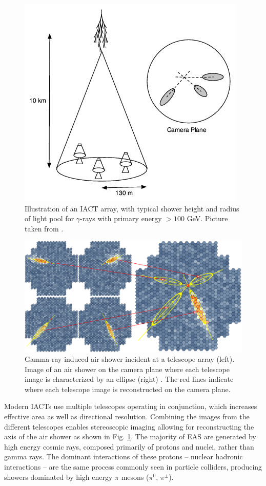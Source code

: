 \documentclass[main.tex]{subfiles}
\begin{document}
\begin{figure}[htbp]
  \centering
  \includegraphics[width=0.68\linewidth]{images/IACT}
  \caption[Illustration of an IACT array.]{Illustration of an IACT array, with typical shower height and radius of light pool for $\gamma$-rays with primary energy $>100$ GeV. Picture taken from \cite{veritas_web}.}
  \label{fig:IACT}
\end{figure}
\begin{figure}[htbp]
  \centering
  \includegraphics[width=0.96\linewidth]{images/Stereo}
  \caption[Gamma-ray EAS at a telescope array.]{Gamma-ray induced air shower incident at a telescope array (left). Image of an air shower on the camera plane where each telescope image is characterized by an ellipse (right) \cite{hess_web}. The red lines indicate where each telescope image is reconstructed on the camera plane.}
  \label{fig:camera_face}
\end{figure}

Modern IACTs use multiple telescopes operating in conjunction, which increases effective area as well as directional resolution. Combining the images from the different telescopes enables stereoscopic imaging allowing for reconstructing the axis of the air shower as shown in Fig. \ref{fig:IACT}. The majority of EAS are generated by high energy cosmic rays, composed primarily of protons and nuclei, rather than gamma rays. The dominant interactions of these protons -- nuclear hadronic interactions -- are the same process commonly seen in particle colliders, producing showers dominated by high energy $\pi$ mesons ($\pi^0$, $\pi^\pm$).
\end{document}
